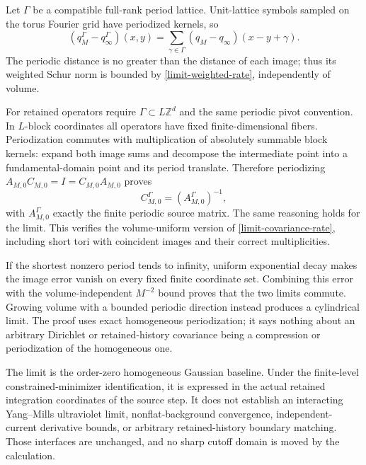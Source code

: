 Let $\Gamma$ be a compatible full-rank period lattice. Unit-lattice
symbols sampled on the torus Fourier grid have periodized kernels, so
\begin{equation}\label{limit-periodization}
 (q_M^\Gamma-q_\infty^\Gamma)(x,y)
 =\sum_{\gamma\in\Gamma}(q_M-q_\infty)(x-y+\gamma).
\end{equation}
The periodic distance is no greater than the distance of each image;
thus its weighted Schur norm is bounded by
\eqref{limit-weighted-rate}, independently of volume.

For retained operators require $\Gamma\subset L\mathbb Z^d$ and
the same periodic pivot convention. In $L$-block coordinates all
operators have fixed finite-dimensional fibers. Periodization
commutes with multiplication of absolutely summable block kernels:
expand both image sums and decompose the intermediate point into a
fundamental-domain point and its period translate. Therefore
periodizing $A_{M,0}C_{M,0}=I=C_{M,0}A_{M,0}$ proves
\[
 C_{M,0}^\Gamma=(A_{M,0}^\Gamma)^{-1},
\]
with $A_{M,0}^\Gamma$ exactly the finite periodic source matrix.
The same reasoning holds for the limit. This verifies the
volume-uniform version of \eqref{limit-covariance-rate}, including
short tori with coincident images and their correct multiplicities.

If the shortest nonzero period tends to infinity, uniform exponential
decay makes the image error vanish on every fixed finite coordinate
set. Combining this error with the volume-independent $M^{-2}$ bound
proves that the two limits commute. Growing volume with a bounded
periodic direction instead produces a cylindrical limit. The proof
uses exact homogeneous periodization; it says nothing about an
arbitrary Dirichlet or retained-history covariance being a compression
or periodization of the homogeneous one.

\begin{remark}\label{limit-scope}
The limit is the order-zero homogeneous Gaussian baseline. Under the
finite-level constrained-minimizer identification, it is expressed in
the actual retained integration coordinates of the source step. It
does not establish an interacting Yang--Mills ultraviolet limit,
nonflat-background convergence, independent-current derivative
bounds, or arbitrary retained-history boundary matching. Those
interfaces are unchanged, and no sharp cutoff domain is moved by
the calculation.
\end{remark}
